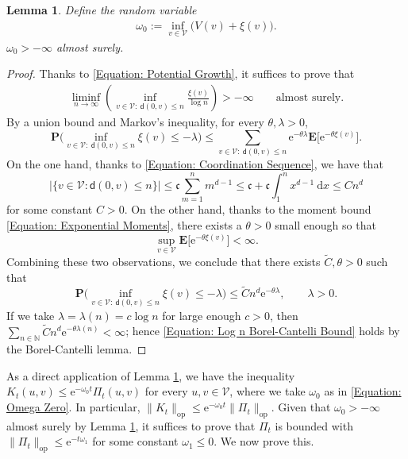 \documentclass{amsart}
\numberwithin{equation}{section}
\newtheorem{lemma}[theorem]{Lemma}
\theoremstyle{definition}
\newcommand\la{\lambda}
\newcommand\om{\omega}
\renewcommand\d{~\mathrm d}
\newcommand\mbb{\mathbb}
\newcommand\mbf{\mathbf}
\newcommand\mf{\mathfrak}
\newcommand\mr{\mathrm}
\newcommand\ms{\mathscr}
\newcommand\msf{\mathsf}
\begin{document}
\begin{lemma}
\label{Lemma: Bounded Below V Plus xi}
Define the random variable
\begin{align}
\label{Equation: Omega Zero}
\om_0:=\inf_{v\in\ms V}\big(V(v)+\xi(v)\big).
\end{align}
$\om_0>-\infty$ almost surely.
\end{lemma}
\begin{proof}
Thanks to \eqref{Equation: Potential Growth}, it suffices to prove that
\begin{align}
\label{Equation: Log n Borel-Cantelli Bound}
\liminf_{n\to\infty}\left(\inf_{v\in\ms V:~\msf d(0,v)\leq n}\frac{\xi(v)}{\log n}\right)>-\infty\qquad\text{almost surely}.
\end{align}
By a union bound and Markov's inequality, for every $\theta,\la>0$,
\[\mbf P\Big(\inf_{v\in\ms V:~\msf d(0,v)\leq n}\xi(v)\leq-\la\Big)
\leq\sum_{v\in\ms V:~\msf d(0,v)\leq n}\mr e^{-\theta\la}\mbf E\big[\mr e^{-\theta\xi(v)}\big].\]
On the one hand, thanks to \eqref{Equation: Coordination Sequence}, we have that
\[|\{v\in\ms V:\msf d(0,v)\leq n\}|\leq\mf c\sum_{m=1}^n m^{d-1}\leq\mf c+\mf c\int_1^nx^{d-1}\d x\leq Cn^d\]
for some constant $C>0$. On the other hand, thanks to the moment bound \eqref{Equation: Exponential Moments},
there exists a $\theta>0$ small enough so that
\[\sup_{v\in\ms V}\mbf E\big[\mr e^{-\theta\xi(v)}\big]<\infty.\]
Combining these two observations, we conclude that there exists $\tilde C,\theta>0$ such that
\[\mbf P\Big(\inf_{v\in\ms V:~\msf d(0,v)\leq n}\xi(v)\leq-\la\Big)\leq \tilde C n^d\mr e^{-\theta\la},\qquad\la>0.\]
If we take $\la=\la(n)=c\log n$ for large enough $c>0$,
then $\sum_{n\in\mbb N}\tilde C n^d\mr e^{-\theta\la(n)}<\infty$;
hence \eqref{Equation: Log n Borel-Cantelli Bound} holds by the
Borel-Cantelli lemma.
\end{proof}

%

As a direct application of Lemma \ref{Lemma: Bounded Below V Plus xi},
we have the inequality $K_t(u,v)\leq\mr e^{-\om_0t}\Pi_t(u,v)$ for every $u,v\in\ms V$,
where we take $\om_0$ as in \eqref{Equation: Omega Zero}.
In particular, $\|K_t\|_{\mr{op}}\leq\mr e^{-\om_0t}\|\Pi_t\|_{\mr{op}}$.
Given that $\om_0>-\infty$ almost surely by Lemma \ref{Lemma: Bounded Below V Plus xi},
it suffices to prove that $\Pi_t$ is bounded with $\|\Pi_t\|_{\mr{op}}\leq \mr e^{-t\om_1}$
for some constant $\om_1\leq 0$. We now prove this.

%
\end{document}

